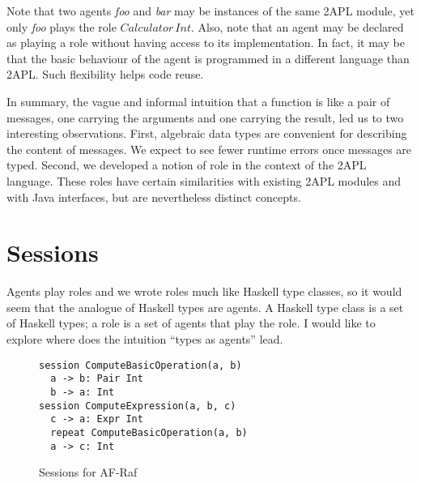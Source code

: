 \documentclass[a4paper,12pt,oneside,fleqn]{book} %
\begin{document}
Note that two agents \textit{foo} and \textit{bar} may be instances of the
same 2APL module, yet only \textit{foo} plays the role
$\mathit{Calculator}\,\mathit{Int}$. Also, note that an agent may be
declared as playing a role without having access to its implementation. In
fact, it may be that the basic behaviour of the agent is programmed in a
different language than 2APL. Such flexibility helps code reuse.

In summary, the vague and informal intuition that a function is like a pair
of messages, one carrying the arguments and one carrying the result, led us
to two interesting observations. First, algebraic data types are convenient
for describing the content of messages. We expect to see fewer runtime
errors once messages are typed. Second, we developed a notion of role in
the context of the 2APL language. These roles have certain similarities
with existing 2APL modules and with Java interfaces, but are nevertheless
distinct concepts.

\section{Sessions} %

Agents play roles and we wrote roles much like Haskell type
classes, so it would seem that the analogue of Haskell types are
agents. A Haskell type class is a set of Haskell types; a role is a
set of agents that play the role. I would like to explore where
does the intuition ``types as agents'' lead.

\begin{figure}\footnotesize %
\begin{verbatim}
session ComputeBasicOperation(a, b)
  a -> b: Pair Int
  b -> a: Int
session ComputeExpression(a, b, c)
  c -> a: Expr Int
  repeat ComputeBasicOperation(a, b)
  a -> c: Int
\end{verbatim}
\caption{Sessions for AF-Raf}\label{fig:sessions}
\end{figure} %
\end{document}
